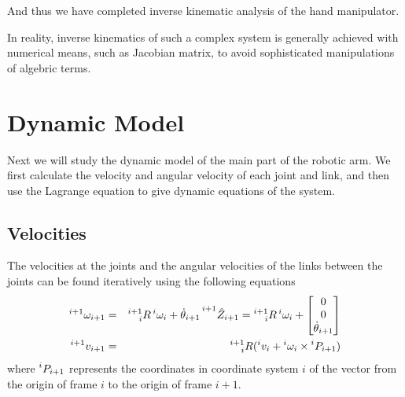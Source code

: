 \documentclass{article}
\begin{document}
And thus we have completed inverse kinematic analysis of the hand manipulator.

In reality, inverse kinematics of such a complex system is generally achieved with numerical means, such as Jacobian matrix, to avoid sophisticated manipulations of algebric terms.

\section{Dynamic Model}

Next we will study the dynamic model of the main part of the robotic arm.
We first calculate the velocity and angular velocity of each joint and link, and then use the Lagrange equation to give dynamic equations of the system.

\subsection{Velocities}

The velocities at the joints and the angular velocities of the links between the joints can be found iteratively using the following equations
\begin{eqnarray*}
    \prescript{i+1}{}{\omega_{i+1}}
    &=& \prescript{i+1}{i}{R} \prescript{i}{}{\omega_i} + \dot \theta_{i+1} \prescript{i+1}{}{\hat Z_{i+1}}
    = \prescript{i+1}{i}{R} \prescript{i}{}{\omega_i} + \begin{bmatrix}
        0 \\ 0 \\ \dot \theta_{i+1}
    \end{bmatrix}\\
    \prescript{i+1}{}{v_{i+1}}
    &=& \prescript{i+1}{i}{R} (\prescript{i}{}{v_i} + \prescript{i}{ }{\omega_i} \times \prescript{i}{}{P_{i+1}})
\end{eqnarray*}
where $\prescript{i}{}{P_{i+1}}$ represents the coordinates in coordinate system $i$ of the vector from the origin of frame $i$ to the origin of frame $i+1$.
\end{document}
